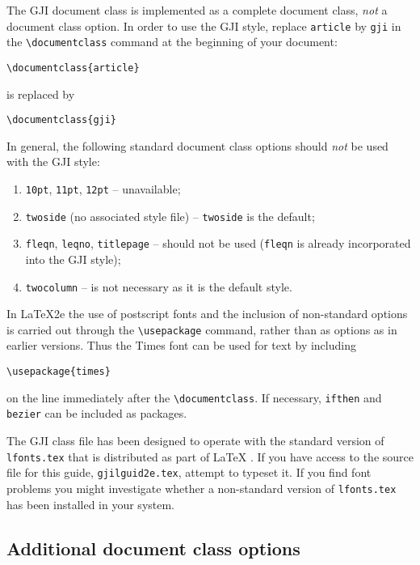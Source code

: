 \documentclass{gji}
\begin{document}
The GJI document class is implemented as a complete document class, {\em
not\/} a document class option. In   order to use the GJI style, replace
\verb"article" by
\verb"gji" in the
\verb"\documentclass" command at the beginning of your document:
\begin{verbatim}
\documentclass{article}
\end{verbatim}
is replaced by
\begin{verbatim}
\documentclass{gji}
\end{verbatim}
In general, the following standard document class options should {\em
not\/} be used with the GJI style:
\begin{enumerate}
  \item \texttt{10pt}, \texttt{11pt}, \texttt{12pt} -- unavailable;
  \item \texttt{twoside} (no associated style file) --
     \texttt{twoside} is the default;
  \item \texttt{fleqn}, \texttt{leqno}, \texttt{titlepage} --
        should not be used (\verb"fleqn" is already incorporated into
        the GJI style);
  \item \texttt{twocolumn} -- is not necessary as it is the default style.
\end{enumerate}

In \LaTeX2e the use of postscript fonts and the inclusion of non-standard
options is carried out through the \verb"\usepackage" command, rather than
as options as in earlier versions.  Thus the Times font can be used for
text by including
\begin{verbatim}
\usepackage{times}
\end{verbatim}
on the line immediately after the \verb"\documentclass". If necessary,
\texttt{ifthen} and \texttt{bezier} can be included as packages.

The GJI class file has been designed to operate with the standard
version of \verb"lfonts.tex" that is distributed as part of \LaTeX
. If you have access to the source file for this guide,
\verb"gjilguid2e.tex", attempt to typeset it.  If you find font
problems you might investigate whether a non-standard version of
\verb"lfonts.tex" has been installed in your system.

\subsection{Additional document class options}\label{classoptions}
\end{document}
